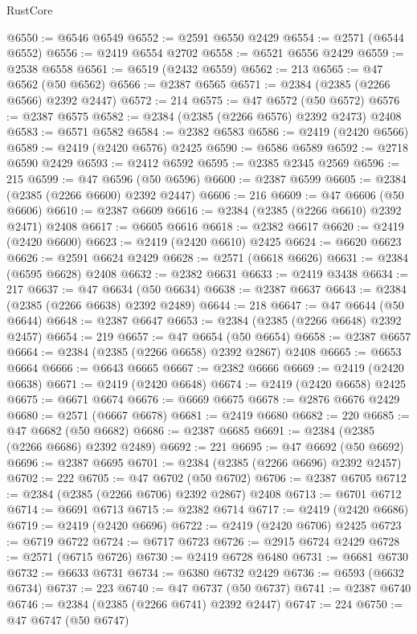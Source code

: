 \begin{lexlean}{RustCore}
\begin{coremodule}
@6550 := @6546 @6549
@6552 := @2591 @6550 @2429
@6554 := @2571 (@6544 @6552)
@6556 := @2419 @6554 @2702
@6558 := @6521 @6556 @2429
@6559 := @2538 @6558
@6561 := @6519 (@2432 @6559)
@6562 := 213
@6565 := @47 @6562 (@50 @6562)
@6566 := @2387 @6565
@6571 := @2384 (@2385 (@2266 @6566) @2392 @2447)
@6572 := 214
@6575 := @47 @6572 (@50 @6572)
@6576 := @2387 @6575
@6582 := @2384 (@2385 (@2266 @6576) @2392 @2473) @2408
@6583 := @6571 @6582
@6584 := @2382 @6583
@6586 := @2419 (@2420 @6566)
@6589 := @2419 (@2420 @6576) @2425
@6590 := @6586 @6589
@6592 := @2718 @6590 @2429
@6593 := @2412 @6592
@6595 := @2385 @2345 @2569
@6596 := 215
@6599 := @47 @6596 (@50 @6596)
@6600 := @2387 @6599
@6605 := @2384 (@2385 (@2266 @6600) @2392 @2447)
@6606 := 216
@6609 := @47 @6606 (@50 @6606)
@6610 := @2387 @6609
@6616 := @2384 (@2385 (@2266 @6610) @2392 @2471) @2408
@6617 := @6605 @6616
@6618 := @2382 @6617
@6620 := @2419 (@2420 @6600)
@6623 := @2419 (@2420 @6610) @2425
@6624 := @6620 @6623
@6626 := @2591 @6624 @2429
@6628 := @2571 (@6618 @6626)
@6631 := @2384 (@6595 @6628) @2408
@6632 := @2382 @6631
@6633 := @2419 @3438
@6634 := 217
@6637 := @47 @6634 (@50 @6634)
@6638 := @2387 @6637
@6643 := @2384 (@2385 (@2266 @6638) @2392 @2489)
@6644 := 218
@6647 := @47 @6644 (@50 @6644)
@6648 := @2387 @6647
@6653 := @2384 (@2385 (@2266 @6648) @2392 @2457)
@6654 := 219
@6657 := @47 @6654 (@50 @6654)
@6658 := @2387 @6657
@6664 := @2384 (@2385 (@2266 @6658) @2392 @2867) @2408
@6665 := @6653 @6664
@6666 := @6643 @6665
@6667 := @2382 @6666
@6669 := @2419 (@2420 @6638)
@6671 := @2419 (@2420 @6648)
@6674 := @2419 (@2420 @6658) @2425
@6675 := @6671 @6674
@6676 := @6669 @6675
@6678 := @2876 @6676 @2429
@6680 := @2571 (@6667 @6678)
@6681 := @2419 @6680
@6682 := 220
@6685 := @47 @6682 (@50 @6682)
@6686 := @2387 @6685
@6691 := @2384 (@2385 (@2266 @6686) @2392 @2489)
@6692 := 221
@6695 := @47 @6692 (@50 @6692)
@6696 := @2387 @6695
@6701 := @2384 (@2385 (@2266 @6696) @2392 @2457)
@6702 := 222
@6705 := @47 @6702 (@50 @6702)
@6706 := @2387 @6705
@6712 := @2384 (@2385 (@2266 @6706) @2392 @2867) @2408
@6713 := @6701 @6712
@6714 := @6691 @6713
@6715 := @2382 @6714
@6717 := @2419 (@2420 @6686)
@6719 := @2419 (@2420 @6696)
@6722 := @2419 (@2420 @6706) @2425
@6723 := @6719 @6722
@6724 := @6717 @6723
@6726 := @2915 @6724 @2429
@6728 := @2571 (@6715 @6726)
@6730 := @2419 @6728 @6480
@6731 := @6681 @6730
@6732 := @6633 @6731
@6734 := @6380 @6732 @2429
@6736 := @6593 (@6632 @6734)
@6737 := 223
@6740 := @47 @6737 (@50 @6737)
@6741 := @2387 @6740
@6746 := @2384 (@2385 (@2266 @6741) @2392 @2447)
@6747 := 224
@6750 := @47 @6747 (@50 @6747)

\end{coremodule}
\end{lexlean}
